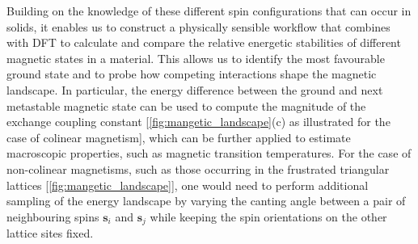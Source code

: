 Building on the knowledge of these different spin configurations that can occur in solids, it enables us to construct a physically sensible workflow that combines with DFT to calculate and compare the relative energetic stabilities of different magnetic states in a material. This allows us to identify the most favourable ground state and to probe how competing interactions shape the magnetic landscape. In particular, the energy difference between the ground and next metastable magnetic state can be used to compute the magnitude of the exchange coupling constant [\cref{fig:mangetic_landscape}(c) as illustrated for the case of colinear magnetism], which can be further applied to estimate macroscopic properties, such as magnetic transition temperatures. For the case of non-colinear magnetisms, such as those occurring in the frustrated triangular lattices [\cref{fig:mangetic_landscape}], one would need to perform additional sampling of the energy landscape by varying the canting angle between a pair of neighbouring spins $\bm{s}_i$ and $\bm{s}_j$ while keeping the spin orientations on the other lattice sites fixed.\cite{baumsteiger2025exploring}  

